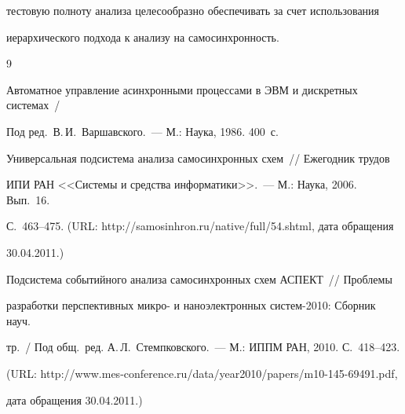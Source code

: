 тестовую полноту анализа целесообразно обеспечивать за счет использования 


иерархического подхода к анализу на самосинхронность.





{\small\frenchspacing


{%




\begin{thebibliography}{9}


      




 Автоматное управление асинхронными процессами в ЭВМ и дискретных системах~/ 


Под ред.\ В.\,И.~Варшавского.~--- М.: Наука, 1986.  400~с.









Универсальная подсистема анализа самосинхронных схем~/\!\!/ Ежегодник трудов 


ИПИ РАН <<Системы и средства информатики>>.~--- М.: Наука, 2006.   Вып.~16.


С.~463--475. (URL: {\sf http://samosinhron.ru/native/full/54.shtml},  дата обращения 


30.04.2011.)









Подсистема событийного анализа самосинхронных схем АСПЕКТ~/\!\!/ Проблемы 


разработки перспективных микро- и наноэлектронных систем-2010: Сборник науч. 


тр.~/ Под общ.\ ред. А.\,Л.~Стемпковского.~--- М.: ИППМ РАН, 2010. С.~418--423. 


(URL: {\sf http://www.mes-conference.ru/data/year2010/papers/m10-145-69491.pdf},  


дата обращения 30.04.2011.)






\end{thebibliography}}}
